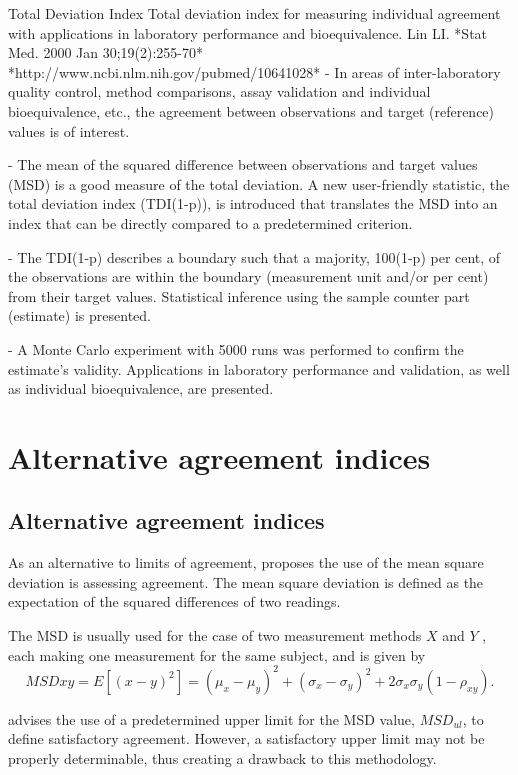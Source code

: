 \documentclass[MAIN.tex]{subfiles}
\begin{document}
\newpage
Total Deviation Index
Total deviation index for measuring individual agreement with applications in laboratory performance and bioequivalence.
Lin LI.
*Stat Med. 2000 Jan 30;19(2):255-70*
*http://www.ncbi.nlm.nih.gov/pubmed/10641028*
- In areas of inter-laboratory quality control, method comparisons, assay validation and individual bioequivalence, etc., 
the agreement between observations and target (reference) values is of interest. 

- The mean of the squared difference between observations and target values (MSD) is a good measure of the total deviation. 
A new user-friendly statistic, the total deviation index (TDI(1-p)), is introduced that translates the MSD into an index
that can be directly compared to a predetermined criterion. 

- The TDI(1-p) describes a boundary such that a majority, 100(1-p) per cent, of the observations are within the boundary
(measurement unit and/or per cent) from their target values. Statistical inference using the sample counter part
(estimate) is presented. 

- A Monte Carlo experiment with 5000 runs was performed to confirm the estimate's validity.
Applications in laboratory performance and validation, as well as individual bioequivalence, are presented.


	\chapter{Alternative agreement indices}
	
	\section{Alternative agreement indices}
	As an alternative to limits of agreement, \citet{lin2002} proposes the use of the mean square deviation is assessing agreement. The mean square deviation is defined as the expectation of the squared differences	of two readings. 
	
	The MSD is usually used for the case of two
	measurement methods $X$ and $Y$ , each making one measurement for	the same subject, and is given by
	\[
	MSDxy = E[(x - y)^2]  = (\mu_{x} - \mu_{y})^2 + (\sigma_{x} -
	\sigma_{y})^2 + 2\sigma_{x}\sigma_{y}(1-\rho_{xy}).
	\]
	
	
	\citet{Barnhart} advises the use of a predetermined upper limit
	for the MSD value, $MSD_{ul}$, to define satisfactory agreement.
	However, a satisfactory upper limit may not be properly
	determinable, thus creating a drawback to this methodology.
	
\end{document}
